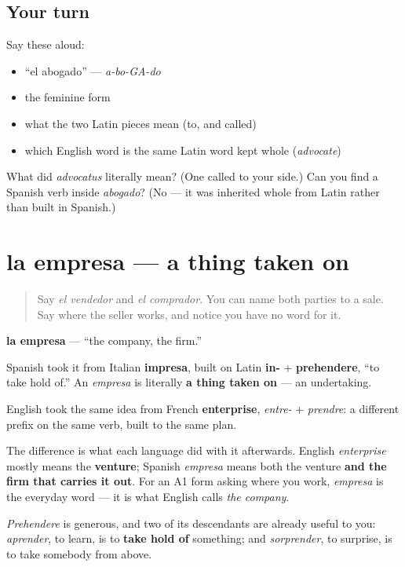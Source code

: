 \subsection*{Your turn}
Say these aloud:

\begin{itemize}
\raggedright
  \item \textquotedblleft{}el abogado\textquotedblright{} — \emph{a-bo-GA-do}
  \item the feminine form
  \item what the two Latin pieces mean (to, and called)
  \item which English word is the same Latin word kept whole (\emph{advocate})
\end{itemize}

\begin{tcolorbox}[breakable,colback=teal!4,colframe=teal!35!black,title={Before you move on}]
What did \emph{advocatus} literally mean? (One called to your side.) Can you find a Spanish verb inside \emph{abogado}? (No — it was inherited whole from Latin rather than built in Spanish.)
\end{tcolorbox}
\section[la empresa]{la empresa — a thing taken on}

\label{lesson:ES-C427-empresa}



\begin{quote}
Say \emph{el vendedor} and \emph{el comprador}. You can name both parties to a sale. Say where the seller works, and notice you have no word for it.
\end{quote}

\begin{cousinweb}
\textbf{la empresa} — \textquotedblleft{}the company, the firm.\textquotedblright{}

Spanish took it from Italian \textbf{impresa}, built on Latin \textbf{in-} + \textbf{prehendere}, \textquotedblleft{}to take hold of.\textquotedblright{} An \emph{empresa} is literally \textbf{a thing taken on} — an undertaking.

English took the same idea from French \textbf{enterprise}, \emph{entre-} + \emph{prendre}: a different prefix on the same verb, built to the same plan.

The difference is what each language did with it afterwards. English \emph{enterprise} mostly means the \textbf{venture}; Spanish \emph{empresa} means both the venture \textbf{and the firm that carries it out}. For an A1 form asking where you work, \emph{empresa} is the everyday word — it is what English calls \emph{the company}.

\emph{Prehendere} is generous, and two of its descendants are already useful to you: \emph{aprender}, to learn, is to \textbf{take hold of} something; and \emph{sorprender}, to surprise, is to take somebody from above.
\end{cousinweb}

